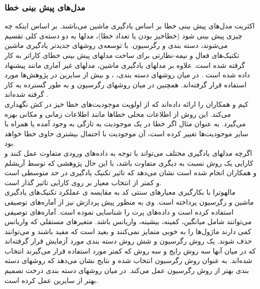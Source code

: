 
\subsubsection{مدل‌های پیش بینی خطا}
اکثریت مدل‌های پیش بینی خطا بر اساس یادگیری ماشین می‌باشند. بر اساس اینکه چه چیزی پیش بینی شود (خطاخیز بودن یا تعداد خطا)، مدلها به دو دسته‌ی کلی تقسیم می‌شوند، دسته بندی و رگرسیون. با توسعه‌ی روشهای جدیدتر یادگیری ماشین تکنیک‌های فعال و نیمه-نظارتی  برای ساخت مدلهای پیش بینی خطای کاراتر به کار گرفته شده است\cite{li2012sample}. علاوه بر مدلهای یادگیری ماشین، مدلهای غیر آماری مانند  پیشنهاد داده شده است \cite{kim2007predicting}. در میان روشهای دسته بندی، 
 ،
 و
بیش از سایرین در پژوهش‌ها مورد استفاده قرار گرفته‌اند. همچنین در میان روشهای رگرسیون 
 و 
به طور گسترده به کار گرفته شده‌اند \cite{nam2014survey}. \\
کیم و همکاران  را ارائه داده‌اند که از اولویت موجودیت‌های خطا خیز در کش نگهداری می‌کند. این روش از اطلاعات محلی خطاها مانند اطلاعات زمانی و مکانی بهره می‌گیرد. به عنوان مثال اگر خطا در یک موجودیت به تازگی به وجود آمده یا همراه با سایر موجودیت‌ها تغییر کرده است، آن موجودیت با احتمال بیشتری حاوی خطا خواهد بود.\\
اگرچه مدلهای یادگیری مختلف می‌تواند  با توجه به داده‌های ورودی متفاوت عمل کنند و کارایی یک روش نسبت به دیگری متفاوت باشد، با این حال پژوهشی که توسط آریشلم  و همکاران  \cite{arisholm2010systematic} انجام شده است نشان می‌دهد که تاثیر  تکنیک یادگیری در حد متوسطی است و کمتر از انتخاب معیار بر روی کارایی تاثیر گذار است.  \\

مالهوترا با بکارگیری معیارهای سنتی کد به مقایسه ی عملکرد تکنیک‌های یادگیری ماشین و رگرسیون پرداخته است\cite{malhotra2014comparative}. وی به منظور پیش پردازش نیز از آماره‌های توصیفی  استفاده کرده است و داده‌های پرت را شناسایی نموده است. آماره‌های توصیفی می‌توانند شامل میانگین، کمینه، بیشینه، واریانس باشد. متغیرهای مستقلی که  واریانس کمی دارند ماژول‌ها را به خوبی متمایز نمی‌کنند و بعید است که مفید باشند و می‌توانند حذف شوند. یک روش رگرسیون و شش روش دسته بندی مورد آزمایش قرار گرفته‌اند که در میان آنها سه روش رایج و سه روش که کمتر مورد استفاده قرار می‌گیرند انتخاب شده‌اند.  به عنوان روش رگرسیون انتخاب شده و نتایج نشان می‌دهد که روشهای دسته بندی بهتر از روش رگرسیون عمل می‌کند. در میان روشهای دسته بندی درخت تصمیم   بهتر از سایرین عمل کرده است. 


